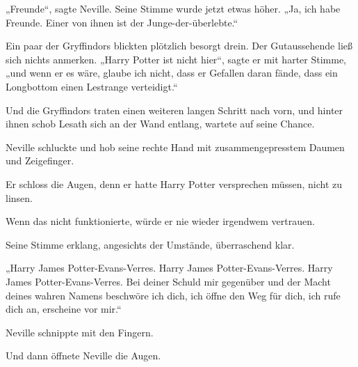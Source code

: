 „Freunde“, sagte Neville. Seine Stimme wurde jetzt etwas höher.
„Ja, ich habe Freunde. Einer von ihnen ist der Junge-der-überlebte.“

Ein paar der Gryffindors blickten plötzlich besorgt drein. Der Gutaussehende ließ sich nichts anmerken.
„Harry Potter ist nicht hier“, sagte er mit harter Stimme, „und wenn er es wäre, glaube ich nicht, dass er Gefallen daran fände, dass ein Longbottom einen Lestrange verteidigt.“

Und die Gryffindors traten einen weiteren langen Schritt nach vorn, und hinter ihnen schob Lesath sich an der Wand entlang, wartete auf seine Chance.

Neville schluckte und hob seine rechte Hand mit zusammengepresstem Daumen und Zeigefinger.

Er schloss die Augen, denn er hatte Harry Potter versprechen müssen, nicht zu linsen.

Wenn das nicht funktionierte, würde er nie wieder irgendwem vertrauen.

Seine Stimme erklang, angesichts der Umstände, überraschend klar.

„Harry James Potter-Evans-Verres. Harry James Potter-Evans-Verres. Harry James Potter-Evans-Verres. Bei deiner Schuld mir gegenüber und der Macht deines wahren Namens beschwöre ich dich, ich öffne den Weg für dich, ich rufe dich an, erscheine vor mir.“

Neville schnippte mit den Fingern.

Und dann öffnete Neville die Augen.

